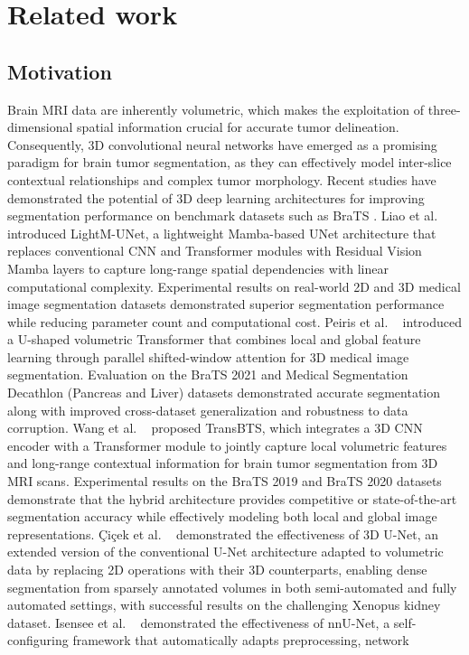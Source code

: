 \documentclass[a4paper,fleqn]{cas-dc}
\begin{document}
\vspace*{-1\baselineskip}



\section{Related work}

\subsection{Motivation}

Brain MRI data are inherently volumetric, which makes the exploitation of three-dimensional spatial information crucial for accurate tumor delineation. Consequently, 3D convolutional neural networks have emerged as a promising paradigm for brain tumor segmentation, as they can effectively model inter-slice contextual relationships and complex tumor morphology. Recent studies have demonstrated the potential of 3D deep learning architectures for improving segmentation performance on benchmark datasets such as BraTS \cite{abidin2024recent,krishnapriya2023survey,zhang2024etunet}. Liao et al. ~\cite{liao2024lightm} introduced LightM-UNet, a lightweight Mamba-based UNet architecture that replaces conventional CNN and Transformer modules with Residual Vision Mamba layers to capture long-range spatial dependencies with linear computational complexity. Experimental results on real-world 2D and 3D medical image segmentation datasets demonstrated superior segmentation performance while reducing parameter count and computational cost. Peiris et al. ~\cite{peiris2021volumetric} introduced a U-shaped volumetric Transformer that combines local and global feature learning through parallel shifted-window attention for 3D medical image segmentation. Evaluation on the BraTS 2021 and Medical Segmentation Decathlon (Pancreas and Liver) datasets demonstrated accurate segmentation along with improved cross-dataset generalization and robustness to data corruption. Wang et al. ~\cite{wang2021transbts} proposed TransBTS, which integrates a 3D CNN encoder with a Transformer module to jointly capture local volumetric features and long-range contextual information for brain tumor segmentation from 3D MRI scans. Experimental results on the BraTS 2019 and BraTS 2020 datasets demonstrate that the hybrid architecture provides competitive or state-of-the-art segmentation accuracy while effectively modeling both local and global image representations. \c{C}i\c{c}ek et al. ~\cite{cciccek20163d} demonstrated the effectiveness of 3D U-Net, an extended version of the conventional U-Net architecture adapted to volumetric data by replacing 2D operations with their 3D counterparts, enabling dense segmentation from sparsely annotated volumes in both semi-automated and fully automated settings, with successful results on the challenging Xenopus kidney dataset. Isensee et al. ~\cite{isensee2021nnu} demonstrated the effectiveness of nnU-Net, a self-configuring framework that automatically adapts preprocessing, network 
\end{document}
